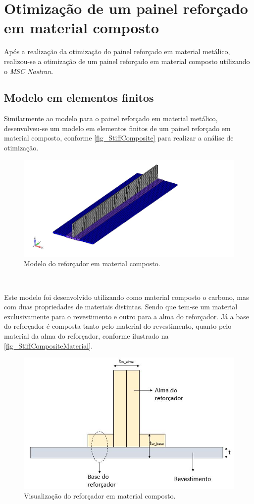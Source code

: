 {\section{Otimização de um painel reforçado em material composto}
Após a realização da otimização do painel reforçado em material metálico, realizou-se a otimização de um painel reforçado em material composto utilizando o \emph{MSC Nastran}.

\subsection{Modelo em elementos finitos}
Similarmente ao modelo para o painel reforçado em material metálico, desenvolveu-se um modelo em elementos finitos de um painel reforçado em material composto, conforme \autoref{fig_StiffComposite} para realizar a análise de otimização.

\begin{figure}[ht]
 \caption{\label{fig_StiffComposite}Modelo do reforçador em material composto.}
 \centering
 \includegraphics[scale=0.7]{figura/StiffComposite}
\end{figure}
\

Este modelo foi desenvolvido utilizando como material composto o carbono, mas com duas propriedades de materiais distintas. Sendo que tem-se um material exclusivamente para o revestimento e outro para a alma do reforçador. Já a base do reforçador é composta tanto pelo material do revestimento, quanto pelo material da alma do reforçador, conforme ilustrado na \autoref{fig_StiffCompositeMaterial}.

\begin{figure}[ht]
 \caption{\label{fig_StiffCompositeMaterial}Visualização do reforçador em material composto.}
 \centering
 \includegraphics[scale=0.7]{figura/StiffCompositeMaterial}
\end{figure}
\

}
